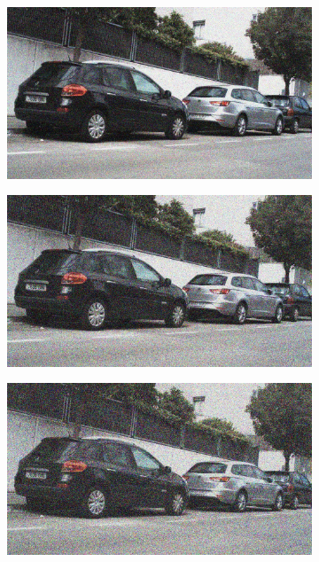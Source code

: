 \documentclass[a4paper]{ctexart}
\begin{document}
\begin{figure}[htbp]
\begin{subfigure}{0.08\textwidth}
			\label{fig：Gamma=0.6, Gauss Noise = 0.1}
		\end{subfigure}
		\begin{subfigure}{0.08\textwidth}
			\captionsetup{font=scriptsize}
			\includegraphics[width=\linewidth]{picture/Edge Detection/degrade/RGB_001 Gamma=0.6, Gauss Noise=0.2}
			\label{fig：Gamma=0.6, Gauss Noise = 0.2}
		\end{subfigure}
		\begin{subfigure}{0.08\textwidth}
			\captionsetup{font=scriptsize}
			\includegraphics[width=\linewidth]{picture/Edge Detection/degrade/RGB_001 Gamma=0.6, Gauss Noise=0.3}
			\label{fig：Gamma=0.6, Gauss Noise = 0.3}
		\end{subfigure}
		\begin{subfigure}{0.08\textwidth}
			\captionsetup{font=scriptsize}
			\includegraphics[width=\linewidth]{picture/Edge Detection/degrade/RGB_001 Gamma=0.6, Gauss Noise=0.4}

\end{subfigure}
\end{figure}
\end{document}
